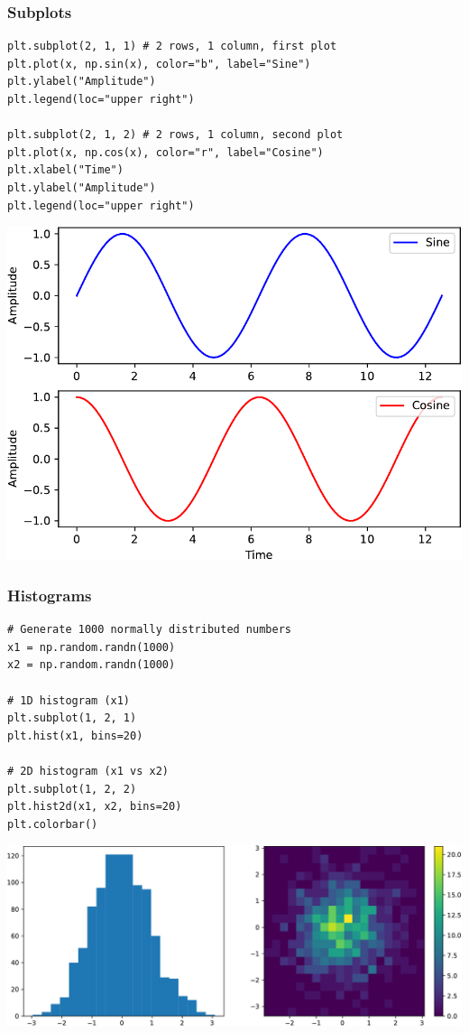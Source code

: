 \documentclass[pdf]{beamer}
\begin{document}
\begin{frame}[fragile]
\frametitle{Subplots}

\begin{lstlisting}[style=python]
plt.subplot(2, 1, 1) # 2 rows, 1 column, first plot
plt.plot(x, np.sin(x), color="b", label="Sine")
plt.ylabel("Amplitude")
plt.legend(loc="upper right")

plt.subplot(2, 1, 2) # 2 rows, 1 column, second plot
plt.plot(x, np.cos(x), color="r", label="Cosine")
plt.xlabel("Time")
plt.ylabel("Amplitude")
plt.legend(loc="upper right")
\end{lstlisting}

\vspace{-0.5cm}
\begin{center}
	\includegraphics[width=.4\textwidth]{plot2.pdf}
\end{center}

\end{frame}

\begin{frame}[fragile]
\frametitle{Histograms}

\begin{lstlisting}[style=python]
# Generate 1000 normally distributed numbers
x1 = np.random.randn(1000) 
x2 = np.random.randn(1000) 

# 1D histogram (x1)
plt.subplot(1, 2, 1)
plt.hist(x1, bins=20)

# 2D histogram (x1 vs x2)
plt.subplot(1, 2, 2)
plt.hist2d(x1, x2, bins=20)
plt.colorbar()
\end{lstlisting}

\vspace{-0.6cm}
\begin{center}
	\includegraphics[width=.72\textwidth]{plot3.pdf}
\end{center}

\end{frame}
\end{document}
